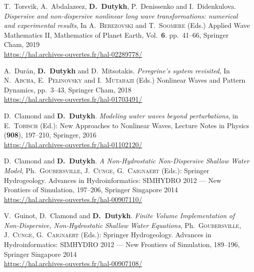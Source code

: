 \documentclass[final, a4paper, oneside, 12pt]{article}
\numberwithin{equation}{section}
\begin{document}
\begin{etaremune}


  \item T.~Torsvik, A.~Abdalazeez, \textbf{D.~Dutykh}, P.~Denissenko and I.~Didenkulova. \textit{Dispersive and non-dispersive nonlinear long wave transformations: numerical and experimental results}, In A.~\textsc{Berezovski} and T.~\textsc{Soomere} (Eds.) Applied Wave Mathematics II, Mathematics of Planet Earth, Vol.~\textbf{6}. pp.~41--66, Springer Cham, 2019 \\ %
  \url{https://hal.archives-ouvertes.fr/hal-02289778/}
  


  \item A.~Dur\'an, \textbf{D.~Dutykh} and D.~Mitsotakis. \textit{Peregrine's system revisited}, In N.~\textsc{Abcha}, E.~\textsc{Pelinovsky} and I.~\textsc{Mutabazi} (Eds.) Nonlinear Waves and Pattern Dynamics, pp.~3--43, Springer Cham, 2018 \\ %
  \url{https://hal.archives-ouvertes.fr/hal-01703491/}
  


  \item D.~Clamond and \textbf{D.~Dutykh}. \textit{Modeling water waves beyond perturbations}, in E.~\textsc{Tobisch} (Ed.): New Approaches to Nonlinear Waves, Lecture Notes in Physics (\textbf{908}), 197--210, Springer, 2016 \\ %
  \url{https://hal.archives-ouvertes.fr/hal-01102120/}
  


  \item D.~Clamond and \textbf{D.~Dutykh}. \textit{A Non-Hydrostatic Non-Dispersive Shallow Water Model}, Ph.~\textsc{Goubersville}, J.~\textsc{Cunge}, G.~\textsc{Caignaert} (Eds.): Springer Hydrogeology. Advances in Hydroinformatics: SIMHYDRO 2012 --- New Frontiers of Simulation, 197--206, Springer Singapore 2014 \\ %
  \url{https://hal.archives-ouvertes.fr/hal-00907110/}

  \item V.~Guinot, D.~Clamond and \textbf{D.~Dutykh}. \textit{Finite Volume Implementation of Non-Dispersive, Non-Hydrostatic Shallow Water Equations}, Ph.~\textsc{Goubersville}, J.~\textsc{Cunge}, G.~\textsc{Caignaert} (Eds.): Springer Hydrogeology. Advances in Hydroinformatics: SIMHYDRO 2012 --- New Frontiers of Simulation, 189--196, Springer Singapore 2014 \\ %
  \url{https://hal.archives-ouvertes.fr/hal-00907108/}
  

\end{etaremune}
\end{document}
